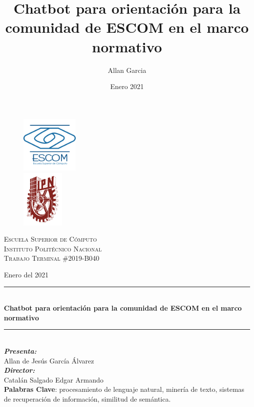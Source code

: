 \documentclass{book}
\title{Chatbot para orientación para la comunidad de ESCOM en el marco normativo}
\author{Allan Garcia}
\date{Enero 2021}
\newcommand{\HRule}{\rule{\linewidth}{0.5mm}} %
\begin{document}
%
%
\begin{titlepage}
		\centering
		\begin{figure}
			\begin{minipage}[t]{0.4\textwidth}
    			\includegraphics[height=80pt]{images/escom}
  			\end{minipage}
  			\hfill
			\begin{minipage}[t]{0.4\textwidth}
				\begin{flushright}
	    			\includegraphics[height=80pt]{images/ipn}				
				\end{flushright}
  			\end{minipage}
		\end{figure}
		
		
		\textsc{\LARGE Escuela Superior de Cómputo}\\[.2cm]
		\textsc{\LARGE Instituto Politécnico Nacional}\\[1.4cm]
		
		\textsc{\Large Trabajo Terminal \#2019-B040}
		
		Enero    del 2021
		
		\HRule \\[0.9cm]
			{ \LARGE \bfseries Chatbot para orientación para la comunidad de ESCOM en el marco normativo}\\[0.7cm]
		\HRule \\[1cm]
		
		\textbf{\Large \emph{Presenta:}}\\[.2cm]
		
		{\large Allan de Jesús García \'{A}lvarez}\\[.8cm]
		
		\textbf{\Large \emph{Director:}}\\[.2cm]
		
		{\large Catalán Salgado Edgar Armando}\\[.8cm]
		
		\textbf{\large Palabras Clave}: procesamiento de lenguaje natural, minería de texto, sistemas de recuperación de información, similitud de semántica.
\end{titlepage}

\tableofcontents












\printbibliography
\end{document}
